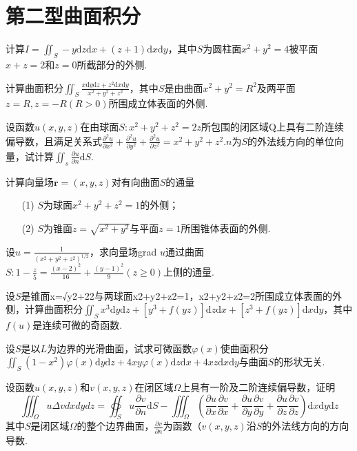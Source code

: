 \section{第二型曲面积分}
\begin{xiti}
	\item 计算$I=\iint_{S}-y \mathrm{d} z \mathrm{d} x+(z+1) \mathrm{d} x \mathrm{d} y$，其中$S$为圆柱面$x^{2}+y^{2}=4$被平面$x+z=2$和$z=0$所截部分的外侧.
	\item 计算曲面积分$\iint_{S} \frac{x \mathrm{d} y \mathrm{d} z+z^{2} \mathrm{d} x \mathrm{d} y}{x^{2}+y^{2}+z^{2}}$，其中$S$是由曲面$x^{2}+y^{2}=R^{2}$及两平面$z=R, z=-R(R>0)$所围成立体表面的外侧.
	\item 设函数$u(x,y,z)$在由球面$S : x^{2}+y^{2}+z^{2}=2 z$所包围的闭区域Q上具有二阶连续偏导数，且满足关系式$\frac{\partial^{2} u}{\partial x^{2}}+\frac{\partial^{2} u}{\partial y^{2}}+\frac{\partial^{2} u}{\partial z^{2}}=x^{2}+y^{2}+z^{2}$.$n$为$S$的外法线方向的单位向量，试计算$\iint_{s} \frac{\partial u}{\partial n} \mathrm{d} S$.
	\item 计算向量场$\boldsymbol{r}=(x, y, z)$对有向曲面$S$的通量
	\begin{enumerate}
		\item [(1)]$S$为球面$x^{2}+y^{2}+z^{2}=1$的外侧；
		\item [(2)]$S$为锥面$z=\sqrt{x^{2}+y^{2}}$与平面$z=1$所围锥体表面的外侧.
	\end{enumerate}
	
	
	\item 设$u=\frac{1}{\left(x^{2}+y^{2}+z^{2}\right)^{1 / 2}}$，求向量场grad $u$通过曲面$S : 1-\frac{z}{5}=\frac{(x-2)^{2}}{16}+\frac{(y-1)^{2}}{9}(z \geqslant 0)$上侧的通量.
	
	\item 设$S$是锥面x=√y2+22与两球面x2+y2+z2=1，x2+y2+z2=2所围成立体表面的外侧，计算曲面积分$\iint_{S} x^{3} \mathrm{d} y \mathrm{d} z+\left[y^{3}+f(y z)\right] \mathrm{d} z\mathrm{d}x+\left[z^{3}+f(y z)\right] \mathrm{d}x\mathrm{d} y$，其中$f(u)$是连续可微的奇函数.
	\item 设$S$是以$L$为边界的光滑曲面，试求可微函数$\varphi(x)$使曲面积分$\iint_S{\left(1-x^2\right)}\varphi\left(x\right)\textrm{d}y\textrm{d}z+4xy\varphi\left(x\right)\textrm{d}z\textrm{d}x+4xz\textrm{d}x\textrm{d}y$与曲面$S$的形状无关.
	\item 	设函数$u(x,y,z)$和$v(x,y,z)$在闭区域$\Omega$上具有一阶及二阶连续偏导数，证明
\[
\iiint_{\Omega} u \Delta v d x d y d z=\oiint_{S} u \frac{\partial v}{\partial n} \mathrm{d} S-\iiint_{\Omega}\left(\frac{\partial u}{\partial x} \frac{\partial v}{\partial x}+\frac{\partial u}{\partial y} \frac{\partial v}{\partial y}+\frac{\partial u}{\partial z} \frac{\partial v}{\partial z}\right) \mathrm{d} x \mathrm{d} y \mathrm{d} z
\]
	其中$S$是闭区域$\Omega$的整个边界曲面，$\frac{\partial v}{\partial n}$为函数（$v(x,y,z)$沿$S$的外法线方向的方向导数.
	
	
\end{xiti}



